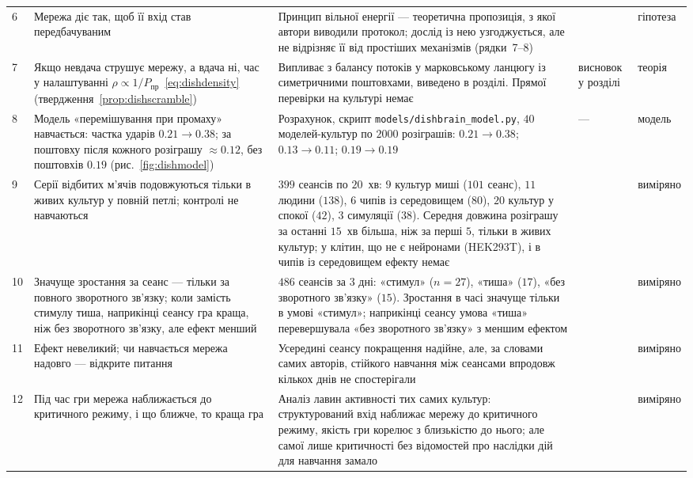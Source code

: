 {\begin{longtable}{>{\raggedright}p{0.5cm}>{\raggedright}p{4.0cm}>{\raggedright}p{5.6cm}>{\raggedright}p{2.3cm}>{\raggedright\arraybackslash}p{1.7cm}}
6 & Мережа діє так, щоб її вхід став передбачуваним & Принцип вільної енергії --- теоретична пропозиція, з якої автори виводили протокол; дослід із нею узгоджується, але не відрізняє її від простіших механізмів (рядки~7--8) & \cite{Friston2010,Kagan2022} & гіпотеза \\
7 & Якщо невдача струшує мережу, а вдача ні, час у налаштуванні $\rho\propto1/P_{\text{пр}}$~\eqref{eq:dishdensity} (твердження~\ref{prop:dishscramble}) & Випливає з балансу потоків у марковському ланцюгу із симетричними поштовхами, виведено в розділі. Прямої перевірки на культурі немає & висновок у розділі & теорія \\
8 & Модель «перемішування при промаху» навчається: частка ударів $0.21\to0.38$; за поштовху після кожного розіграшу $\approx0.12$, без поштовхів $0.19$ (рис.~\ref{fig:dishmodel}) & Розрахунок, скрипт \texttt{models/dishbrain\_model.py}, $40$ моделей-культур по $2000$ розіграшів: $0.21\to0.38$; $0.13\to0.11$; $0.19\to0.19$ & --- & модель \\
9 & Серії відбитих м'ячів подовжуються тільки в живих культур у повній петлі; контролі не навчаються & $399$ сеансів по $20$~хв: $9$ культур миші ($101$ сеанс), $11$ людини ($138$), $6$ чипів із середовищем ($80$), $20$ культур у спокої ($42$), $3$ симуляції ($38$). Середня довжина розіграшу за останні $15$~хв більша, ніж за перші $5$, тільки в живих культур; у клітин, що не є нейронами (HEK293T), і в чипів із середовищем ефекту немає & \cite{Kagan2022} & виміряно \\
10 & Значуще зростання за сеанс --- тільки за повного зворотного зв'язку; коли замість стимулу тиша, наприкінці сеансу гра краща, ніж без зворотного зв'язку, але ефект менший & $486$ сеансів за $3$ дні: «стимул» ($n=27$), «тиша» ($17$), «без зворотного зв'язку» ($15$). Зростання в часі значуще тільки в умові «стимул»; наприкінці сеансу умова «тиша» перевершувала «без зворотного зв'язку» з меншим ефектом & \cite{Kagan2022} & виміряно \\
11 & Ефект невеликий; чи навчається мережа надовго --- відкрите питання & Усередині сеансу покращення надійне, але, за словами самих авторів, стійкого навчання між сеансами впродовж кількох днів не спостерігали & \cite{Kagan2022} & виміряно \\
12 & Під час гри мережа наближається до критичного режиму, і що ближче, то краща гра & Аналіз лавин активності тих самих культур: структурований вхід наближає мережу до критичного режиму, якість гри корелює з близькістю до нього; але самої лише критичності без відомостей про наслідки дій для навчання замало & \cite{Habibollahi2023} & виміряно \\

\end{longtable}}

